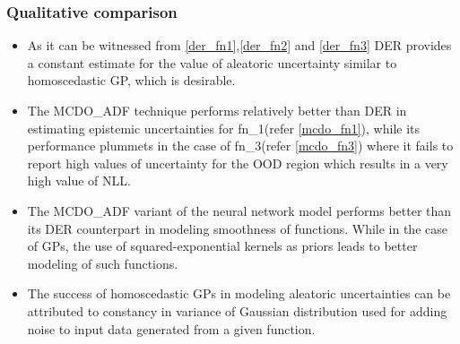 \subsubsection{Qualitative comparison}\label{sec_qual_comparison}
\begin{itemize}
	\item As it can be witnessed from \ref{der_fn1},\ref{der_fn2} and \ref{der_fn3} DER provides a constant estimate for the value of aleatoric uncertainty similar to homoscedastic GP, which is desirable. 
	\item The MCDO\_ADF technique  performs relatively better than DER in estimating epistemic uncertainties for fn\_1(refer \ref{mcdo_fn1}), while its performance plummets in the case of fn\_3(refer \ref{mcdo_fn3}) where it fails to report high values of uncertainty for the OOD region which results in a very high value of NLL.
	\item The MCDO\_ADF variant of the neural network model performs better than its DER counterpart in modeling smoothness of functions. While in the case of GPs, the use of squared-exponential kernels as priors leads to better modeling of such functions.  
	\item The success of homoscedastic GPs in modeling  aleatoric uncertainties can be attributed to constancy in variance of Gaussian distribution used for adding noise to input data generated from a given function. 
	
	
\end{itemize}
